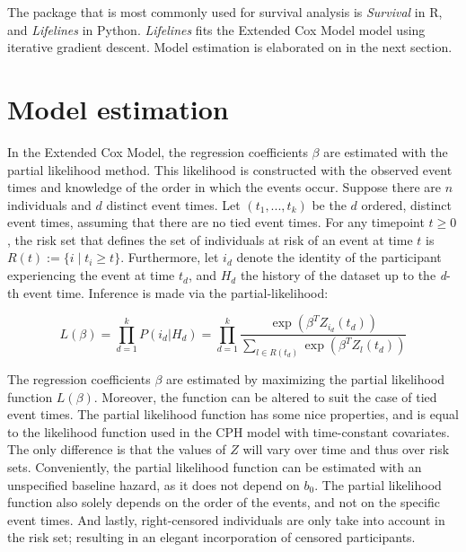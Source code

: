 The package that is most commonly used for survival analysis is \textit{Survival} in R, and \textit{Lifelines} in Python. \textit{Lifelines} fits the Extended Cox Model model using iterative gradient descent. Model estimation is elaborated on in the next section. 


\section{Model estimation}
\label{section:methodology:model_estimation}
In the Extended Cox Model, the regression coefficients $\beta$ are estimated with the partial likelihood method. This likelihood is constructed with the observed event times and knowledge of the order in which the events occur. Suppose there are $n$ individuals and $d$ distinct event times. Let $(t_1, ..., t_k)$ be the $d$ ordered, distinct event times, assuming that there are no tied event times. For any timepoint $t \geq 0$, the risk set that defines the set of individuals at risk of an event at time $t$ is $R(t) := \{i \mid t_i \geq t\}$. Furthermore, let $i_d$ denote the identity of the participant experiencing the event at time $t_d$, and $H_d$ the history of the dataset up to the \textit{d}-th event time. Inference is made via the partial-likelihood: 

$$L(\beta) = \prod_{d=1}^{k}P(i_d | H_d) = \prod_{d=1}^{k} \frac{\exp(\beta^T Z_{i_d}(t_d))}{\sum_{l \in R(t_d)} \exp(\beta^T Z_{l}(t_d))}$$

The regression coefficients $\beta$ are estimated by maximizing the partial likelihood function $L(\beta)$. Moreover, the function can be altered to suit the case of tied event times. The partial likelihood function has some nice properties, and is equal to the likelihood function used in the CPH model with time-constant covariates. The only difference is that the values of $Z$ will vary over time and thus over risk sets. Conveniently, the partial likelihood function can be estimated with an unspecified baseline hazard, as it does not depend on $b_0$. The partial likelihood function also solely depends on the order of the events, and not on the specific event times. And lastly, right-censored individuals are only take into account in the risk set; resulting in an elegant incorporation of censored participants. 

